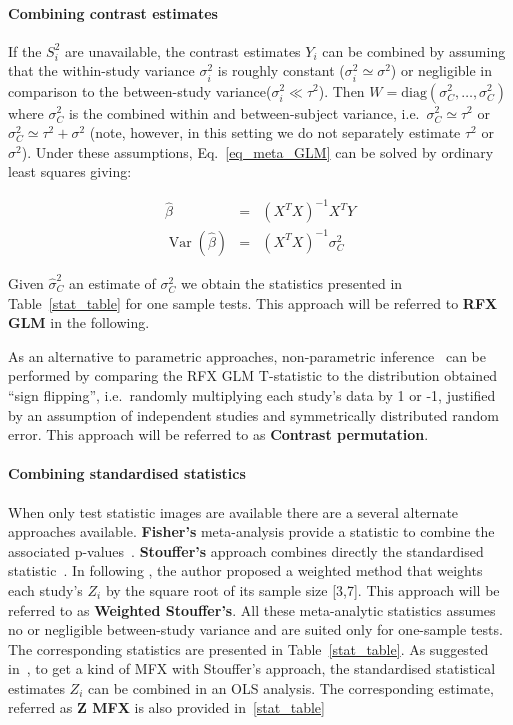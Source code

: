 \documentclass{llncs}
\DeclareMathOperator{\Var}{Var}
\newcommand{\effectvector}{Y}
\newcommand{\effect}[1][i]{\effectvector_{#1}}
\newcommand{\vareffect}[1][i]{S^2_{#1}}
\newcommand{\zeffect}[1][i]{Z_{#1}}
\newcommand{\varCombined}{\sigma^2_{C}}
\newcommand{\estvarCombined}{\hat\sigma^2_{C}}
\newcommand{\varBetween}{\tau^2}
\newcommand{\varWithinCommon}{\sigma^2}
\newcommand{\varWithin}[1][i]{\sigma^2_{#1}}
\newcommand{\transpose}{^T}
\begin{document}
\paragraph{Combining contrast estimates}
If the $\vareffect$ are unavailable, the contrast estimates $\effect$ can be combined by assuming that the within-study variance $\varWithin$ is roughly constant ($\varWithin \simeq \sigma^2$) or negligible in comparison to the between-study variance($\varWithin \ll \varBetween$). Then $W = \mathrm{diag}( \varCombined, \ldots, \varCombined )$ where $\varCombined$ is the combined within and between-subject variance, i.e.\ $\varCombined \simeq \varBetween$ or $\varCombined \simeq \varBetween + \varWithinCommon$ (note, however, in this setting we do not separately estimate $\varBetween$ or $\varWithinCommon$). Under these assumptions, Eq.~\eqref{eq_meta_GLM} can be solved by ordinary least squares giving:

\begin{eqnarray}
	\hat \beta  &=& (X\transpose X)^{-1} X\transpose \effectvector \\
	\Var(\hat \beta)  &=& (X\transpose X)^{-1} \varCombined
	\label{eq_OLS}
\end{eqnarray}

Given $\estvarCombined$ an estimate of $\varCombined$ we obtain the statistics presented in Table~\ref{stat_table} for one sample tests. This approach will be referred to \textbf{RFX GLM} in the following.

As an alternative to parametric approaches, non-parametric inference~\cite{Holmes1996,Nichols2002} can be performed by comparing the RFX GLM T-statistic to the distribution obtained ``sign flipping'', i.e.\ randomly multiplying each study's data by 1 or -1, justified by an assumption of independent studies and symmetrically distributed random error. This approach will be referred to as \textbf{Contrast permutation}.

\paragraph{Combining standardised statistics} 
When only test statistic images are available there are a several alternate approaches available. \textbf{Fisher's} meta-analysis provide a statistic to combine the associated p-values~\cite{Fisher1932}. \textbf{Stouffer's} approach combines directly the standardised statistic~\cite{Stouffer1949}. In \cite{Zaykin2011} following \cite{Liptak1958}, the author proposed a weighted method that weights each study's $\zeffect$ by the square root of its sample size [3,7]. This approach will be referred to as \textbf{Weighted Stouffer's}. All these meta-analytic statistics assumes no or negligible between-study variance and are suited only for one-sample tests. The corresponding statistics are presented in Table~\ref{stat_table}.
As suggested in~\cite{Salimi-khorshidi2009}, to get a kind of MFX with Stouffer's approach, the standardised statistical estimates $\zeffect$ can be combined in an OLS analysis. The corresponding estimate, referred as \textbf{Z MFX} is also provided in~\ref{stat_table}
\end{document}
